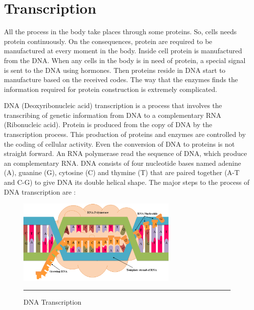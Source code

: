 \section{Transcription}

All the process in the body take places through some proteins. So, cells needs protein continuously. 
On the consequences, protein are required to be manufactured at every moment in the body. Inside cell 
protein is manufactured from the DNA. When any cells in the body is in need of protein, a special signal 
is sent to the DNA using hormones. Then proteins reside in DNA start to manufacture based on the 
received codes. The way that the enzymes finds the information required for protein construction is 
extremely complicated.

DNA (Deoxyribonucleic acid) transcription is a process that involves the transcribing of 
genetic information from DNA to a complementary RNA (Ribonucleic acid). Protein is produced 
from the copy of DNA by the transcription process. This production of proteins and enzymes 
are controlled by the coding of cellular activity. Even the conversion of DNA to proteins 
is not straight forward. An RNA polymerase read the sequence of DNA, which produce an 
complementary RNA. DNA consists of four nucleotide bases named adenine (A), guanine (G), 
cytosine (C) and thymine (T) that are paired together (A-T and C-G) to give DNA its double 
helical shape. The major steps to the process of DNA transcription are :


\begin{figure}[tb]
	\centering
		\includegraphics[width=0.7\textwidth,keepaspectratio]{diagrams/Transcription.png}
		\rule{35em}{0.5pt}
	\caption{DNA Transcription}
	\label{fig:transcription}
\end{figure}



